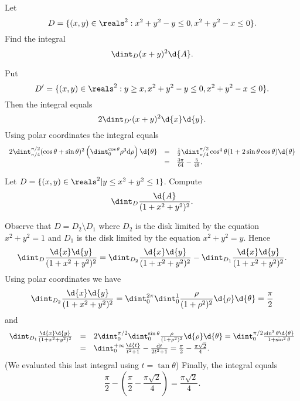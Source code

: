 \begin{pro}
 Let $$D = \{(x, y) \in \reals^2: x^2 + y^2 - y \leq 0, x^2 + y^2
- x \leq 0\}.$$ Find the integral $$\dint_D (x +
y)^2\d{A}.$$\begin{answer} Put  $$D' = \{(x, y) \in \reals^2:
 y \geq x, x^2 + y^2 - y \leq 0, x^2 + y^2 - x \leq 0\}.$$ Then
 the integral equals$$2\dint_{D'} (x + y)^2\d{x}\d{y}.$$Using polar coordinates 
the integral equals
$$\begin{array}{lll}2\dint _{\pi/4} ^{\pi/2}(\cos\theta + 
\sin\theta)^2\left(\dint_0 ^{\cos\theta} \rho^3{\rm d\rho}\right) \d{\theta}
& = & \frac{1}{2}\dint _{\pi/4} ^{\pi/2} \cos^4\theta (1 +
2\sin\theta\cos\theta)\d{\theta} \\ &  = &  \frac{3\pi}{64} -
\frac{5}{48}. \end{array}$$
\end{answer}
\end{pro}
\begin{pro}
 Let $D = \{(x, y)\in\reals^2| y \leq x^2
+ y^2 \leq 1\}$. Compute
$$\dint _{D} \frac{\d{A}}{(1 + x^2 + y^2)^2}.$$
\begin{answer} Observe that $D = D_2 \setminus D_1$ where $D_2$ is the disk
limited by the equation $x^2 + y^2 = 1$ and $D_1$ is the disk
limited by the equation $x^2 + y^2 = y.$ Hence
$$\dint _{D} \frac{\d{x}\d{y}}{(1 + x^2 + y^2)^2} = \dint _{D_2} 
\frac{\d{x}\d{y}}{(1 + x^2 + y^2)^2}
- \dint _{D_1} \frac{\d{x}\d{y}}{(1 + x^2 + y^2)^2}.$$ Using polar
coordinates we have
$$\dint _{D_2} \frac{\d{x}\d{y}}{(1 + x^2 + y^2)^2} =
\dint _{0} ^{2\pi}\dint_0 ^1 \frac{\rho}{(1 + \rho^2)^2} \d{\rho}
\d{\theta} =  \frac{\pi}{2}$$and
$$\begin{array}{lll}\dint _{D_1} \frac{\d{x}\d{y}}{(1 + x^2 + y^2)^2} &
=& 2\dint _{0} ^{\pi/2}\dint_0 ^{\sin\theta} \frac{\rho}{(1 +
\rho^2)^2} \d{\rho} \d{\theta} =  \dint _0 ^{\pi/2}
\frac{\sin^2\theta \d{\theta}}{1 + \sin^2\theta} \\ & = & \dint _0
^{+\infty}\frac{\d{t}}{t^2 + 1} -  \frac{{\rm d}t}{2t^2 + 1} =
\frac{\pi}{2} - \frac{\pi\sqrt{2}}{4}. \\ \end{array}
$$(We evaluated this last integral using $t = \tan\theta$) Finally, the integral 
equals
$$\frac{\pi}{2} - \left(\frac{\pi}{2} -
\frac{\pi\sqrt{2}}{4}\right) = \frac{\pi\sqrt{2}}{4}.$$



\end{answer}
\end{pro}


